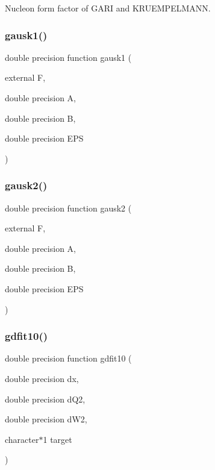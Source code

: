 Nucleon form factor of G\+A\+RI and K\+R\+U\+E\+M\+P\+E\+L\+M\+A\+NN. 

\mbox{\label{djangoh__h_8f_a1aed970120eadb2285e5b9ce8df951bf}} 
\subsubsection{\texorpdfstring{gausk1()}{gausk1()}}
{\footnotesize\ttfamily double precision function gausk1 (\begin{DoxyParamCaption}\item[{external}]{F,  }\item[{double precision}]{A,  }\item[{double precision}]{B,  }\item[{double precision}]{E\+PS }\end{DoxyParamCaption})}

\mbox{\label{djangoh__h_8f_aaf9cf7dde73f44b854176970c334b11b}} 
\subsubsection{\texorpdfstring{gausk2()}{gausk2()}}
{\footnotesize\ttfamily double precision function gausk2 (\begin{DoxyParamCaption}\item[{external}]{F,  }\item[{double precision}]{A,  }\item[{double precision}]{B,  }\item[{double precision}]{E\+PS }\end{DoxyParamCaption})}

\mbox{\label{djangoh__h_8f_aafdf2f8800c083262ef67339d17cf775}} 
\subsubsection{\texorpdfstring{gdfit10()}{gdfit10()}}
{\footnotesize\ttfamily double precision function gdfit10 (\begin{DoxyParamCaption}\item[{double precision}]{dx,  }\item[{double precision}]{d\+Q2,  }\item[{double precision}]{d\+W2,  }\item[{character$\ast$1}]{target }\end{DoxyParamCaption})}

